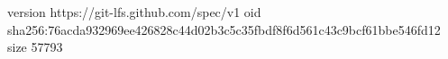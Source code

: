 version https://git-lfs.github.com/spec/v1
oid sha256:76acda932969ee426828c44d02b3c5c35fbdf8f6d561c43c9bcf61bbe546fd12
size 57793
